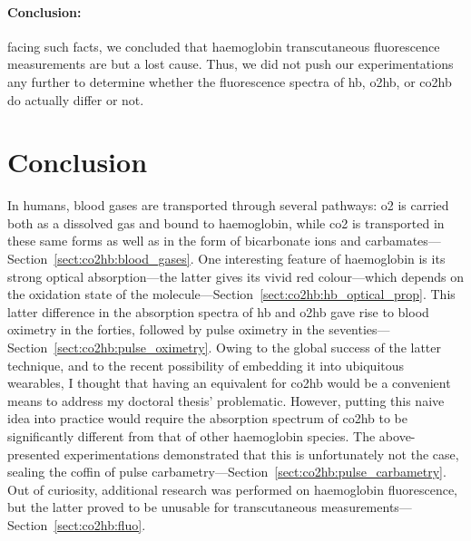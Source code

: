 \paragraph{Conclusion:} facing such facts, we concluded that haemoglobin transcutaneous fluorescence measurements are but a lost cause. Thus, we did not push our experimentations any further to determine whether the fluorescence spectra of \gls{hb}, \gls{o2hb}, or \gls{co2hb} do actually differ or not.

\section{Conclusion}\label{sect:co2hb:conclusion}

In humans, blood gases are transported through several pathways: \gls{o2} is carried both as a dissolved gas and bound to haemoglobin, while \gls{co2} is transported in these same forms as well as in the form of bicarbonate ions and carbamates---Section~\ref{sect:co2hb:blood_gases}. One interesting feature of haemoglobin is its strong optical absorption---the latter gives \myblood{} its vivid red colour---which depends on the oxidation state of the molecule---Section~\ref{sect:co2hb:hb_optical_prop}. This latter difference in the absorption spectra of \gls{hb} and \gls{o2hb} gave rise to blood oximetry in the forties, followed by pulse oximetry in the seventies---Section~\ref{sect:co2hb:pulse_oximetry}. Owing to the global success of the latter technique, and to the recent possibility of embedding it into ubiquitous wearables, I thought that having an equivalent for \gls{co2hb} would be a convenient means to address my doctoral thesis' problematic. However, putting this naive idea into practice would require the absorption spectrum of \gls{co2hb} to be significantly different from that of other haemoglobin species. The above-presented experimentations demonstrated that this is unfortunately not the case, sealing the coffin of pulse carbametry---Section~\ref{sect:co2hb:pulse_carbametry}. Out of curiosity, additional research was performed on haemoglobin fluorescence, but the latter proved to be unusable for \invivo{} transcutaneous measurements---Section~\ref{sect:co2hb:fluo}.

